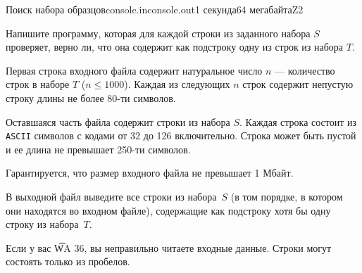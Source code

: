 \begin{problem}{Поиск набора образцов}{console.in}{console.out}{1 секунда}{64 мегабайта}{Z2}

Напишите программу, которая для каждой строки из заданного набора $S$
проверяет, верно ли, что она содержит как подстроку одну из строк из
набора $T$.

\InputFile

Первая строка входного файла содержит натуральное число $n$ --- 
количество строк в наборе $T$ ($n \le 1000$).
Каждая из следующих $n$ строк содержит непустую строку длины не более 80-ти
символов.

Оставшаяся часть файла содержит строки из набора $S$.
Каждая строка состоит из \texttt{ASCII} символов с кодами от 32 до 126
включительно. Строка может быть пустой и ее длина не превышает
250-ти символов.

Гарантируется, что размер входного файла не превышает 1 Мбайт.

\OutputFile

В выходной файл выведите все строки из набора~$S$ (в том порядке, в котором они находятся во
входном файле), содержащие как подстроку
хотя бы одну строку из набора~$T$.

\Example

\begin{example}
%
\end{example}

\Note

Если у вас \t{WA 36}, вы неправильно читаете входные данные. Строки могут состоять только из пробелов.

\end{problem}
